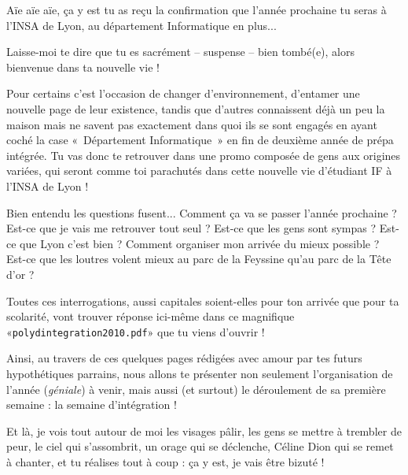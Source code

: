 Aïe aïe aïe, ça y est tu as reçu la confirmation que l'année prochaine tu seras à l'INSA de Lyon, au département Informatique en plus...

\vspace{1em}

Laisse-moi te dire que tu es sacrément -- suspense -- bien tombé(e), alors
bienvenue dans ta nouvelle vie !


\vspace{1em}

Pour certains c'est l'occasion de changer d'environnement, d'entamer une
nouvelle page de leur existence, tandis que d'autres connaissent déjà un peu la maison mais
ne savent pas exactement dans quoi ils se sont engagés en ayant coché la case «~Département
Informatique~» en fin de deuxième année de prépa intégrée. Tu vas donc te retrouver dans
une promo composée de gens aux origines variées, qui seront comme toi parachutés
dans cette nouvelle vie d'étudiant IF à l'INSA de Lyon !


\vspace{1em}

Bien entendu les questions fusent... Comment ça va se passer l'année
prochaine ? Est-ce que je vais me retrouver tout seul ?  Est-ce que les gens
sont sympas ? Est-ce que  Lyon c'est bien ? Comment organiser mon arrivée du
mieux possible ? Est-ce que les loutres volent mieux au parc de la Feyssine
qu'au parc de la Tête d'or ?


\vspace{1em}

Toutes ces interrogations, aussi capitales soient-elles pour ton arrivée que pour ta
scolarité, vont trouver réponse ici-même dans ce magnifique
«\texttt{polydintegration2010.pdf}» que tu viens d'ouvrir !


\vspace{1em}

Ainsi, au travers de ces quelques pages rédigées avec amour par tes futurs
hypothétiques parrains, nous allons te présenter non seulement l'organisation
de l'année (\emph{géniale}) à venir, mais aussi (et surtout) le déroulement de sa première
semaine : la semaine d'intégration !


\vspace{1em}

Et là, je vois tout autour de moi les visages pâlir, les gens se mettre à
trembler de peur, le ciel qui s'assombrit, un orage qui se
déclenche, Céline Dion qui se remet à chanter, et tu réalises tout à coup : ça y est,
je vais être bizuté !


